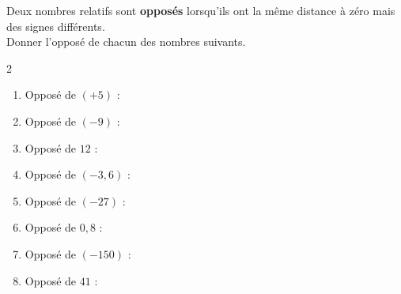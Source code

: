 \documentclass[11pt]{article}
\begin{document}
\begin{exercicedevoir}[8]
Deux nombres relatifs sont \textbf{opposés} lorsqu'ils ont la même distance à zéro mais des
signes différents.\\
Donner l'opposé de chacun des nombres suivants.
\smallskip

\begin{multicols}{2}
\begin{enumerate}[itemsep=1em]
\item Opposé de $(+5)$ : \dotfill
\item Opposé de $(-9)$ : \dotfill
\item Opposé de $12$ : \dotfill
\item Opposé de $(-3,6)$ : \dotfill
\item Opposé de $(-27)$ : \dotfill
\item Opposé de $0,8$ : \dotfill
\item Opposé de $(-150)$ : \dotfill
\item Opposé de $41$ : \dotfill
\end{enumerate}
\end{multicols}
\end{exercicedevoir}
\end{document}
